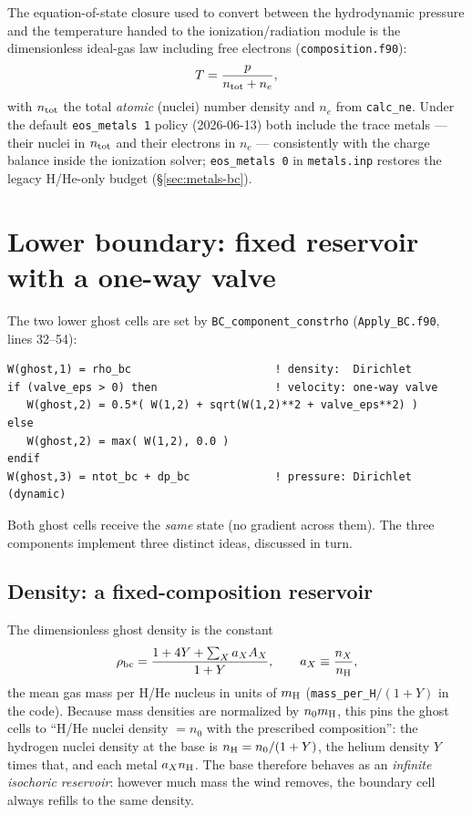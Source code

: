 \documentclass[english,a4paper]{kiseon_memo}
\begin{document}
The equation-of-state closure used to convert between the hydrodynamic
pressure and the temperature handed to the ionization/radiation module
is the dimensionless ideal-gas law including free electrons
(\texttt{composition.f90}):
\begin{equation}
T = \frac{p}{n_{\rm tot} + n_e},
\label{eq:eos}
\end{equation}
with $n_{\rm tot}$ the total \emph{atomic} (nuclei) number density and
$n_e$ from \texttt{calc\_ne}. Under the default \texttt{eos\_metals 1}
policy (2026-06-13) both include the trace metals --- their nuclei in
$n_{\rm tot}$ and their electrons in $n_e$ --- consistently with the
charge balance inside the ionization solver; \texttt{eos\_metals 0} in
\texttt{metals.inp} restores the legacy H/He-only budget
(\S\ref{sec:metals-bc}).

\section{Lower boundary: fixed reservoir with a one-way valve}
\label{sec:lower}

The two lower ghost cells are set by
\texttt{BC\_component\_constrho} (\texttt{Apply\_BC.f90}, lines
32--54):
\begin{lstlisting}[style=code]
W(ghost,1) = rho_bc                      ! density:  Dirichlet
if (valve_eps > 0) then                  ! velocity: one-way valve
   W(ghost,2) = 0.5*( W(1,2) + sqrt(W(1,2)**2 + valve_eps**2) )
else
   W(ghost,2) = max( W(1,2), 0.0 )
endif
W(ghost,3) = ntot_bc + dp_bc             ! pressure: Dirichlet (dynamic)
\end{lstlisting}
Both ghost cells receive the \emph{same} state (no gradient across
them). The three components implement three distinct ideas, discussed
in turn.

\subsection{Density: a fixed-composition reservoir}

The dimensionless ghost density is the constant
\begin{equation}
\rho_{\rm bc} = \frac{1 + 4Y + \sum_X a_X A_X}{1 + Y},
\qquad a_X \equiv \frac{n_X}{n_{\rm H}},
\end{equation}
the mean gas mass per H/He nucleus in units of $m_{\rm H}$
(\texttt{mass\_per\_H}$/(1{+}Y)$ in the code). Because mass densities
are normalized by $n_0 m_{\rm H}$, this pins the ghost cells to
``H/He nuclei density $= n_0$ with the prescribed composition'': the
hydrogen nuclei density at the base is $n_{\rm H} = n_0/(1+Y)$, the
helium density $Y$ times that, and each metal $a_X n_{\rm H}$. The
base therefore behaves as an \emph{infinite isochoric reservoir}:
however much mass the wind removes, the boundary cell always refills
to the same density.
\end{document}

